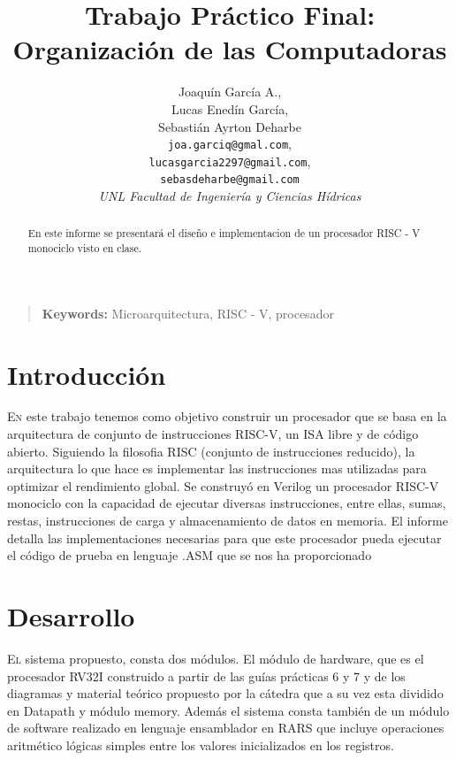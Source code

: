 \documentclass{article}
\newenvironment{keywords}
  {\begin{quote}\small\textbf{Keywords:}}
  {\end{quote}}
\begin{document}
\title{Trabajo Práctico Final: \\ 
	Organización de las Computadoras}
       

\author{
    Joaquín García A., \\
    Lucas Enedín García, \\
    Sebastián Ayrton Deharbe \\[1ex]
    \texttt{joa.garciq@gmal.com}, \\
    \texttt{lucasgarcia2297@gmail.com}, \\
    \texttt{sebasdeharbe@gmail.com} \\[1ex]
    \textit{UNL Facultad de Ingeniería y Ciencias Hídricas}
}


\maketitle

\begin{abstract}
En este informe se presentará el diseño e implementacion de un procesador RISC - V monociclo visto en clase.
\end{abstract}

\begin{keywords}
Microarquitectura, RISC - V, procesador
\end{keywords}

\section{Introducción}

\lettrine{E}{n} este trabajo tenemos como objetivo construir un procesador que se basa en la arquitectura de conjunto de instrucciones RISC-V, un ISA libre y de código abierto. Siguiendo la filosofia RISC (conjunto de instrucciones reducido), la arquitectura lo que hace es implementar las instrucciones mas utilizadas para optimizar el rendimiento global.
Se construyó en Verilog un procesador RISC-V monociclo con la capacidad de ejecutar diversas instrucciones, entre ellas, sumas, restas, instrucciones de carga y almacenamiento de datos en memoria. El informe detalla las implementaciones necesarias para que este procesador pueda ejecutar el código de prueba en lenguaje .ASM que se nos ha proporcionado

\section{Desarrollo}
\lettrine{E}{l} sistema propuesto, consta dos módulos. El módulo de hardware, que es el procesador RV32I construido a partir de las guías prácticas 6 y 7 y de los diagramas y material teórico propuesto por la cátedra que a su vez esta dividido en Datapath y módulo memory. Además el sistema consta también de un módulo de software realizado en lenguaje ensamblador en RARS que incluye operaciones aritmético lógicas simples entre los valores inicializados en los registros.
\end{document}
